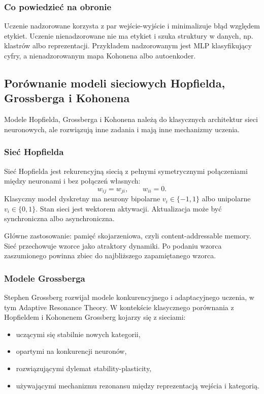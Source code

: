 \subsubsection{Co powiedzieć na obronie}

Uczenie nadzorowane korzysta z par wejście-wyjście i minimalizuje błąd względem etykiet. Uczenie nienadzorowane nie ma etykiet i szuka struktury w danych, np. klastrów albo reprezentacji. Przykładem nadzorowanym jest MLP klasyfikujący cyfry, a nienadzorowanym mapa Kohonena albo autoenkoder.

\subsection{Porównanie modeli sieciowych Hopfielda, Grossberga i Kohonena}

Modele Hopfielda, Grossberga i Kohonena należą do klasycznych architektur sieci neuronowych, ale rozwiązują inne zadania i mają inne mechanizmy uczenia.

\subsubsection{Sieć Hopfielda}

Sieć Hopfielda jest rekurencyjną siecią z pełnymi symetrycznymi połączeniami między neuronami i bez połączeń własnych:
\[
w_{ij}=w_{ji},\qquad w_{ii}=0.
\]
Klasyczny model dyskretny ma neurony bipolarne $v_i\in\{-1,1\}$ albo unipolarne $v_i\in\{0,1\}$. Stan sieci jest wektorem aktywacji. Aktualizacja może być synchroniczna albo asynchroniczna.

Główne zastosowanie: pamięć skojarzeniowa, czyli content-addressable memory. Sieć przechowuje wzorce jako atraktory dynamiki. Po podaniu wzorca zaszumionego powinna zbiec do najbliższego zapamiętanego wzorca.

\subsubsection{Modele Grossberga}

Stephen Grossberg rozwijał modele konkurencyjnego i adaptacyjnego uczenia, w tym Adaptive Resonance Theory. W kontekście klasycznego porównania z Hopfieldem i Kohonenem Grossberg kojarzy się z sieciami:
\begin{itemize}
  \item uczącymi się stabilnie nowych kategorii,
  \item opartymi na konkurencji neuronów,
  \item rozwiązującymi dylemat stability-plasticity,
  \item używającymi mechanizmu rezonansu między reprezentacją wejścia i kategorią.
\end{itemize}


